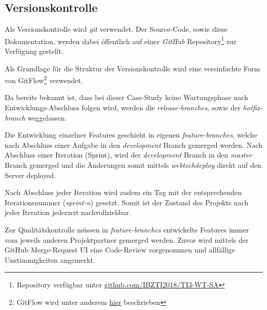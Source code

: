 \subsection{Versionskontrolle}

Als Versionskontrolle wird \emph{git} verwendet. Der Source-Code, sowie diese Dokumentation, werden dabei öffentlich auf einer \emph{GitHub} Repository\footnote{Repository verfügbar unter \href{https://github.com/IBZTI2018/TI3-WT-SA}{github.com/IBZTI2018/TI3-WT-SA}} zur Verfügung gestellt.

Als Grundlage für die Struktur der Versionskontrolle wird eine vereinfachte Form von GitFlow\footnote{GitFlow wird unter anderem \href{https://datasift.github.io/gitflow/IntroducingGitFlow.html}{hier} beschrieben} verwendet.

Da bereits bekannt ist, dass bei dieser Case-Study keine Wartungsphase nach Entwicklungs-Abschluss folgen wird, werden die \emph{release-branches}, sowie der \emph{hotfix-branch} weggelassen.

Die Entwicklung einzelner Features geschieht in eigenen \emph{feature-branches}, welche nach Abschluss einer Aufgabe in den \emph{development} Branch gemerged werden. Nach Abschluss einer Iteration (Sprint), wird der \emph{development} Branch in den \emph{master} Branch gemerged und die Änderungen somit mittels \emph{webtechdeploy} direkt auf den Server deployed.

Nach Abschluss jeder Iteration wird zudem ein Tag mit der entsprechenden Iterationsnummer (\emph{sprint-n}) gesetzt. Somit ist der Zustand des Projekts nach jeder Iteration jederzeit nachvollziehbar.

Zur Qualitätskontrolle müssen in \emph{feature-branches} entwickelte Features immer vom jeweils anderen Projektpartner gemerged werden. Zuvor wird mittels der GitHub Merge-Request UI eine Code-Review vorgenommen und allfällige Unstimmigkeiten angemerkt.
